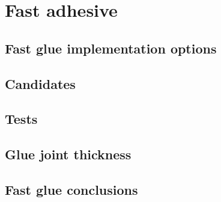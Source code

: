 \chapter{Fast adhesive}



\section{Fast glue implementation options}




\section{Candidates}






\section{Tests}





\section{Glue joint thickness}





\section{Fast glue conclusions}

